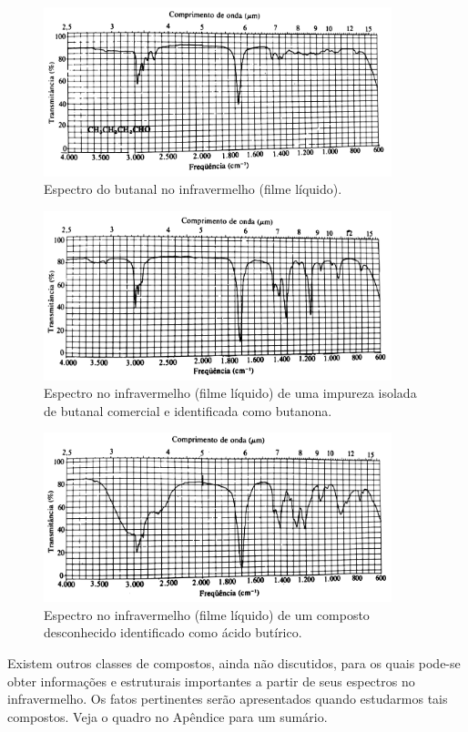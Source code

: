 \begin{figure}[h]
    \centering
    \includegraphics[width=0.9\textwidth,angle=0]{content/images/Figura_9_9.pdf}
    \caption{Espectro do butanal no infravermelho (filme líquido).}
    \label{figura_9_9}
\end{figure}

\begin{figure}[h]
    \centering
    \includegraphics[width=0.9\textwidth,angle=0]{content/images/Figura_9_10.pdf}
    \caption{Espectro no infravermelho (filme líquido) de uma impureza isolada de butanal comercial e identificada como butanona.}
    \label{figura_9_10}
\end{figure}

\begin{figure}[h]
    \centering
    \includegraphics[width=0.9\textwidth,angle=0]{content/images/Figura_9_11.pdf}
    \caption{Espectro no infravermelho (filme líquido) de um composto desconhecido identificado como ácido butírico.}
    \label{figura_9_11}
\end{figure}

Existem outros classes de compostos, ainda não discutidos, para os quais pode-se obter informações e estruturais importantes a partir de seus espectros no infravermelho. Os fatos pertinentes serão apresentados quando estudarmos tais compostos. Veja o quadro no Apêndice para um sumário. 